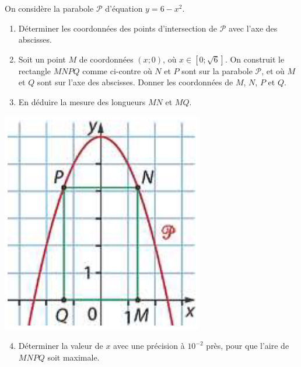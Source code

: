 \documentclass[11pt]{article}
\begin{document}
\begin{exo}
On considère la parabole $\mathscr P$ d'équation
$y=6-x^2$.\\
\begin{minipage}{.75\textwidth}
  \begin{enumerate}
    \item Déterminer les coordonnées des points d'intersection de $\mathscr P$
      avec l'axe des abscisses.
    \item Soit un point $M$ de coordonnées $(x;0)$, où $x\in[0;\sqrt6]$. On
      construit le rectangle $MNPQ$ comme ci-contre où $N$ et $P$ sont sur la
      parabole $\mathscr P$, et où $M$ et $Q$ sont sur l'axe des abscisses.
      Donner les coordonnées de $M$, $N$, $P$ et $Q$.
    \item En déduire la mesure des longueurs $MN$ et $MQ$.
  \end{enumerate}
\end{minipage}
\begin{minipage}{.25\textwidth}
  \begin{center}
\includegraphics[scale=.3]{parabole.png}
  \end{center}
\end{minipage}
\begin{enumerate}
  \setcounter{enumi}{3}
    \item Déterminer la valeur de $x$ avec une précision à $10^{-2}$ près, pour
      que l'aire de $MNPQ$ soit maximale.
\end{enumerate}
\end{exo}
\end{document}
